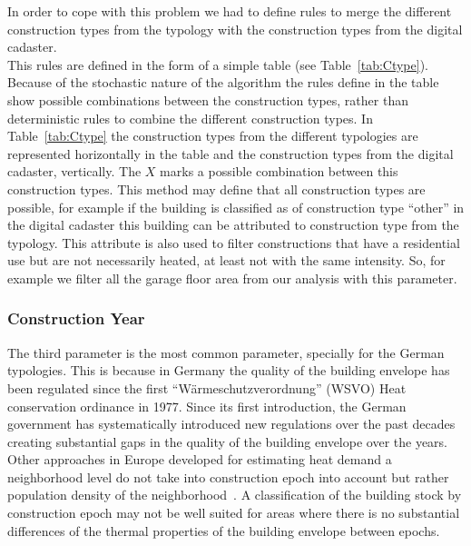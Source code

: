 \documentclass[authoryear,preprint,review,12pt]{elsarticle}
\begin{document}
\begin{linenumbers}
In order to cope with this problem we had to define rules to merge the
different construction types from the typology with the construction types from
the digital cadaster.\\

This rules are defined in the form of a simple table (see
Table~\ref{tab:Ctype}).  Because of the stochastic nature of the algorithm the
rules define in the table show possible combinations between the construction
types, rather than deterministic rules to combine the different construction
types.  In Table~\ref{tab:Ctype} the construction types from the different
typologies are represented horizontally in the table and the construction types
from the digital cadaster, vertically.  The $X$ marks a possible combination
between this construction types.  This method may define that all construction
types are possible, for example if the building is classified as of
construction type ``other'' in the digital cadaster this building can be
attributed to construction type from the typology.  This attribute is also used
to filter constructions that have a residential use but are not necessarily
heated, at least not with the same intensity.  So, for example we filter all
the garage floor area from our analysis with this parameter.\\


 
\subsubsection{Construction Year}

The third parameter is the most common parameter, specially for the German
typologies. This is because in Germany the quality of the building envelope
has been regulated since the first ``Wärmeschutzverordnung'' (WSVO) Heat
conservation ordinance in 1977. Since its first introduction, the German
government has systematically introduced new regulations over the past decades
creating substantial gaps in the quality of the building envelope over the
years.\\

Other approaches in Europe developed for estimating heat demand a neighborhood
level do not take into construction epoch into account but rather population
density of the neighborhood~\cite{Finney.2012,Finney.2012b,Finney.2012c}. A
classification of the building stock by construction epoch may not be well
suited for areas where there is no substantial differences of the thermal
properties of the building envelope between epochs.\\


\end{linenumbers}
\end{document}
